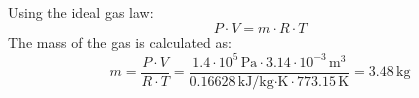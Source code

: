 Using the ideal gas law:  
\[
P \cdot V = m \cdot R \cdot T
\]  
The mass of the gas is calculated as:  
\[
m = \frac{P \cdot V}{R \cdot T} = \frac{1.4 \cdot 10^5 \, \text{Pa} \cdot 3.14 \cdot 10^{-3} \, \text{m}^3}{0.16628 \, \text{kJ/kg·K} \cdot 773.15 \, \text{K}} = 3.48 \, \text{kg}
\]